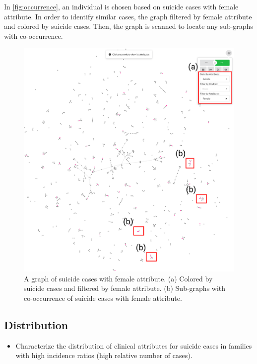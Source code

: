 \documentclass{vgtc}                          %
\begin{document}
In \autoref{fig:occurrence}, an individual is chosen based on suicide cases with female attribute. In order to identify similar cases, the graph filtered by female attribute and colored by suicide cases. Then, the graph is scanned to locate any sub-graphs with co-occurrence.

\begin{figure}[tb]
 \centering %
 \includegraphics[width=\columnwidth]{pictures/occurrence.png}
 \caption{A graph of suicide cases with female attribute. (a) Colored by suicide cases and filtered by female attribute. (b) Sub-graphs with co-occurrence of suicide cases with female attribute.}
 \label{fig:occurrence}
\end{figure}

\subsection{Distribution}

\begin{itemize}
\item{Characterize the distribution of clinical attributes for suicide cases in families with high incidence ratios (high relative number of cases).}
\end{itemize}
\end{document}
